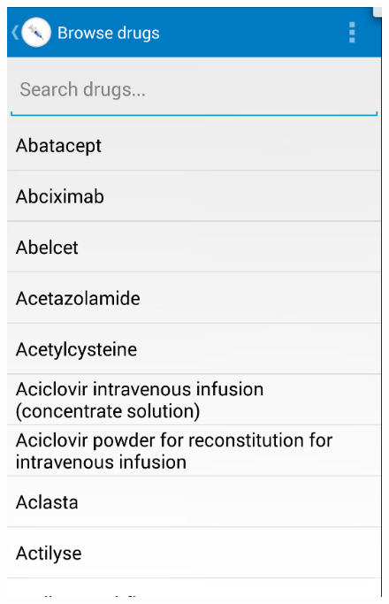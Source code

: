 \begin{figure}[H]
\begin{minipage}{.5\textwidth}
  \includegraphics[width=.8\linewidth]{Images/screenshots/API18/browse.png}
\end{minipage}
\end{figure}

